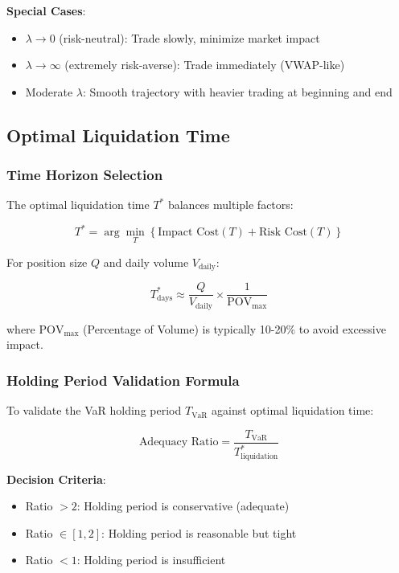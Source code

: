 \documentclass[11pt,a4paper]{article}
\begin{document}
\textbf{Special Cases}:

\begin{itemize}
    \item $\lambda \to 0$ (risk-neutral): Trade slowly, minimize market impact
    \item $\lambda \to \infty$ (extremely risk-averse): Trade immediately (VWAP-like)
    \item Moderate $\lambda$: Smooth trajectory with heavier trading at beginning and end
\end{itemize}

\subsection{Optimal Liquidation Time}

\subsubsection{Time Horizon Selection}

The optimal liquidation time $T^*$ balances multiple factors:

\begin{equation}
T^* = \arg\min_T \left\{\text{Impact Cost}(T) + \text{Risk Cost}(T)\right\}
\end{equation}

For position size $Q$ and daily volume $V_{\text{daily}}$:

\begin{equation}
T^*_{\text{days}} \approx \frac{Q}{V_{\text{daily}}} \times \frac{1}{\text{POV}_{\max}}
\end{equation}

where $\text{POV}_{\max}$ (Percentage of Volume) is typically 10-20\% to avoid excessive impact.

\subsubsection{Holding Period Validation Formula}

To validate the VaR holding period $T_{\text{VaR}}$ against optimal liquidation time:

\begin{equation}
\text{Adequacy Ratio} = \frac{T_{\text{VaR}}}{T^*_{\text{liquidation}}}
\end{equation}

\textbf{Decision Criteria}:
\begin{itemize}
    \item Ratio $> 2$: Holding period is conservative (adequate)
    \item Ratio $\in [1, 2]$: Holding period is reasonable but tight
    \item Ratio $< 1$: Holding period is insufficient
\end{itemize}
\end{document}
